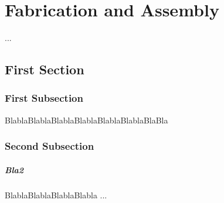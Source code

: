 %

\chapter{Fabrication and Assembly}
\label{Ch:Fab}	

...

%
%



\section{First Section }

\subsection{First Subsection}
\label{subsec:DesignA}

BlablaBlablaBlablaBlablaBlablaBlablaBlaBla

%
%



\subsection{Second Subsection}

\paragraph{Bla2} 
BlablaBlablaBlablaBlabla ... 


